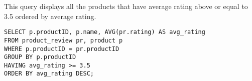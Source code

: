 This query displays all the products that have average rating above or equal to 3.5 ordered by average rating.

\begin{lstlisting}
SELECT p.productID, p.name, AVG(pr.rating) AS avg_rating
FROM product_review pr, product p
WHERE p.productID = pr.productID
GROUP BY p.productID
HAVING avg_rating >= 3.5
ORDER BY avg_rating DESC;
\end{lstlisting}